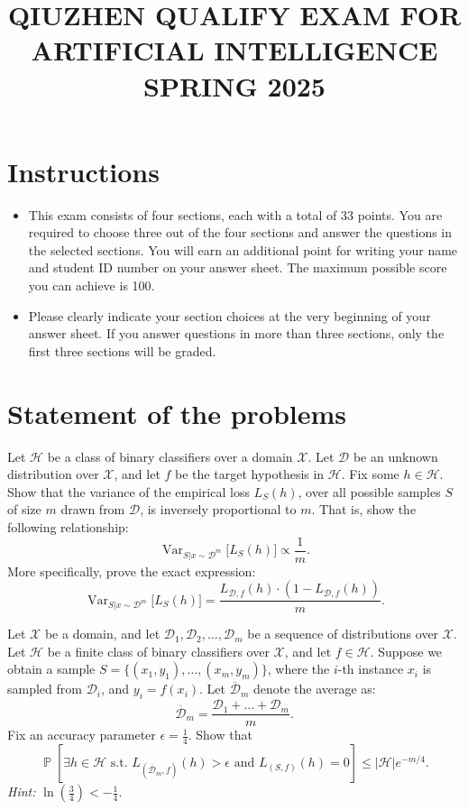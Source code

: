 \documentclass[11pt,a4paper]{article}
\title{\textbf{QIUZHEN QUALIFY EXAM FOR ARTIFICIAL INTELLIGENCE}\\[0.5em]\Large SPRING 2025}
\date{}
\author{}
\DeclareMathOperator{\Var}{Var}
\DeclareMathOperator{\Pbb}{\mathbb{P}}
\newcommand{\examstatement}[1]{%
  \par\addvspace{0.85em}%
  \noindent{\bfseries #1}\par\nobreak\addvspace{0.28em}%
}
\theoremstyle{definition}
\begin{document}
\maketitle
\vspace{-3em}

\tableofcontents

\section{Instructions}
\begin{itemize}
    \item This exam consists of four sections, each with a total of 33 points. You are required to choose three out of the four sections and answer the questions in the selected sections. You will earn an additional point for writing your name and student ID number on your answer sheet. The maximum possible score you can achieve is 100.
    \item Please clearly indicate your section choices at the very beginning of your answer sheet. If you answer questions in more than three sections, only the first three sections will be graded.
\end{itemize}

\section{Statement of the problems}

\par

\examstatement{Problem 1. [7 pts.]}
Let $\mathcal{H}$ be a class of binary classifiers over a domain $\mathcal{X}$. Let $\mathcal{D}$ be an unknown distribution over $\mathcal{X}$, and let $f$ be the target hypothesis in $\mathcal{H}$. Fix some $h \in \mathcal{H}$. Show that the variance of the empirical loss $L_S(h)$, over all possible samples $S$ of size $m$ drawn from $\mathcal{D}$, is inversely proportional to $m$. That is, show the following relationship:
\[
\Var_{S | x \sim \mathcal{D}^m} \bigl[ L_S(h) \bigr] \propto \frac{1}{m}.
\]
More specifically, prove the exact expression:
\[
\Var_{S | x \sim \mathcal{D}^m} \bigl[ L_S(h) \bigr] = \frac{L_{\mathcal{D}, f}(h) \cdot (1 - L_{\mathcal{D}, f}(h))}{m}.
\]

\examstatement{Problem 2. [7 pts.]}
Let $\mathcal{X}$ be a domain, and let $\mathcal{D}_1, \mathcal{D}_2, \dots, \mathcal{D}_m$ be a sequence of distributions over $\mathcal{X}$. Let $\mathcal{H}$ be a finite class of binary classifiers over $\mathcal{X}$, and let $f \in \mathcal{H}$. Suppose we obtain a sample $S = \{(x_1, y_1), \dots, (x_m, y_m)\}$, where the $i$-th instance $x_i$ is sampled from $\mathcal{D}_i$, and $y_i = f(x_i)$. Let $\overline{\mathcal{D}}_m$ denote the average as:
\[
\overline{\mathcal{D}}_m = \frac{\mathcal{D}_1 + \dots + \mathcal{D}_m}{m}.
\]
Fix an accuracy parameter $\epsilon = \frac{1}{4}$. Show that
\[
\Pbb \left[ \exists h \in \mathcal{H} \text{ s.t. } L_{(\overline{\mathcal{D}}_m, f)}(h) > \epsilon \text{ and } L_{(S, f)}(h) = 0 \right] \le |\mathcal{H}| e^{-m/4}.
\]
\textit{Hint:} $\ln\left(\frac{3}{4}\right) < -\frac{1}{4}$.
\end{document}
